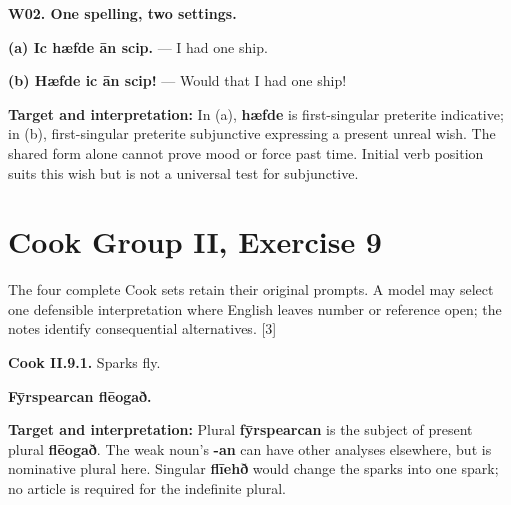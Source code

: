 \par\begin{minipage}{\linewidth}\raggedright
\textbf{W02. One spelling, two settings.}

\textbf{(a) Ic hæfde ān scip.} — I had one ship.

\textbf{(b) Hæfde ic ān scip!} — Would that I had one ship!

\textbf{Target and interpretation:} In (a), \textbf{hæfde} is first-singular preterite indicative; in (b), first-singular preterite subjunctive expressing a present unreal wish. The shared form alone cannot prove mood or force past time. Initial verb position suits this wish but is not a universal test for subjunctive.

\end{minipage}\par\addvspace{4pt}

\section*{Cook Group II, Exercise 9}

The four complete Cook sets retain their original prompts. A model may select one defensible interpretation where English leaves number or reference open; the notes identify consequential alternatives. [3]

\par\begin{minipage}{\linewidth}\raggedright
\textbf{Cook II.9.1.} Sparks fly.

\textbf{Fȳrspearcan flēogað.}

\textbf{Target and interpretation:} Plural \textbf{fȳrspearcan} is the subject of present plural \textbf{flēogað}. The weak noun's \textbf{-an} can have other analyses elsewhere, but is nominative plural here. Singular \textbf{flīehð} would change the sparks into one spark; no article is required for the indefinite plural.

\end{minipage}\par\addvspace{4pt}

